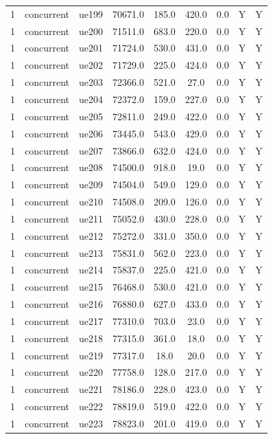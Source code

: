\begin{table}[ht]
\begin{tabular}{|c|c|c|c|c|c|c|c|c|}
1 & concurrent & ue199 & 70671.0 & 185.0 & 420.0 & 0.0 & Y & Y \\
1 & concurrent & ue200 & 71511.0 & 683.0 & 220.0 & 0.0 & Y & Y \\
1 & concurrent & ue201 & 71724.0 & 530.0 & 431.0 & 0.0 & Y & Y \\
1 & concurrent & ue202 & 71729.0 & 225.0 & 424.0 & 0.0 & Y & Y \\
1 & concurrent & ue203 & 72366.0 & 521.0 & 27.0 & 0.0 & Y & Y \\
1 & concurrent & ue204 & 72372.0 & 159.0 & 227.0 & 0.0 & Y & Y \\
1 & concurrent & ue205 & 72811.0 & 249.0 & 422.0 & 0.0 & Y & Y \\
1 & concurrent & ue206 & 73445.0 & 543.0 & 429.0 & 0.0 & Y & Y \\
1 & concurrent & ue207 & 73866.0 & 632.0 & 424.0 & 0.0 & Y & Y \\
1 & concurrent & ue208 & 74500.0 & 918.0 & 19.0 & 0.0 & Y & Y \\
1 & concurrent & ue209 & 74504.0 & 549.0 & 129.0 & 0.0 & Y & Y \\
1 & concurrent & ue210 & 74508.0 & 209.0 & 126.0 & 0.0 & Y & Y \\
1 & concurrent & ue211 & 75052.0 & 430.0 & 228.0 & 0.0 & Y & Y \\
1 & concurrent & ue212 & 75272.0 & 331.0 & 350.0 & 0.0 & Y & Y \\
1 & concurrent & ue213 & 75831.0 & 562.0 & 223.0 & 0.0 & Y & Y \\
1 & concurrent & ue214 & 75837.0 & 225.0 & 421.0 & 0.0 & Y & Y \\
1 & concurrent & ue215 & 76468.0 & 530.0 & 421.0 & 0.0 & Y & Y \\
1 & concurrent & ue216 & 76880.0 & 627.0 & 433.0 & 0.0 & Y & Y \\
1 & concurrent & ue217 & 77310.0 & 703.0 & 23.0 & 0.0 & Y & Y \\
1 & concurrent & ue218 & 77315.0 & 361.0 & 18.0 & 0.0 & Y & Y \\
1 & concurrent & ue219 & 77317.0 & 18.0 & 20.0 & 0.0 & Y & Y \\
1 & concurrent & ue220 & 77758.0 & 128.0 & 217.0 & 0.0 & Y & Y \\
1 & concurrent & ue221 & 78186.0 & 228.0 & 423.0 & 0.0 & Y & Y \\
1 & concurrent & ue222 & 78819.0 & 519.0 & 422.0 & 0.0 & Y & Y \\
1 & concurrent & ue223 & 78823.0 & 201.0 & 419.0 & 0.0 & Y & Y \\

\end{tabular}
\end{table}

